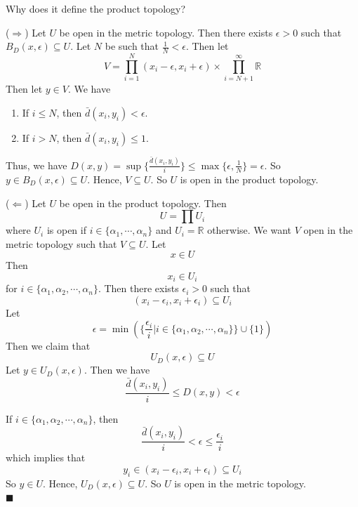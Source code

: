 \documentclass[main.tex]{subfiles}
\begin{document}
\par Why does it define the product topology?
\par ($\Rightarrow$) Let $U$ be open in the metric topology. Then there exists $\epsilon >  0$ such that $B_D(x, \epsilon) \subseteq U$. Let $N$ be such that $\frac{1}{N} < \epsilon$. Then let 
\begin{equation}
    V = \prod_{i=1}^{N} (x_i - \epsilon, x_i + \epsilon) \times \prod_{i=N+1}^{\infty} \mathbb{R}
\end{equation}
Then let $y\in V$. We have
\begin{enumerate}
    \item If $i \le N$, then $\bar{d}(x_i, y_i) < \epsilon$.
    \item If $i > N$, then $\bar{d}(x_i, y_i) \le 1$.
\end{enumerate}
Thus, we have $D(x, y) = \sup \{\frac{\bar{d}(x_i, y_i)}{i}\} \le \max\{\epsilon, \frac{1}{N}\} = \epsilon$. So $y\in B_D(x, \epsilon) \subseteq U$. Hence, $V \subseteq U$. So $U$ is open in the product topology.
\par ($\Leftarrow$) Let $U$ be open in the product topology. Then 
\begin{equation}
    U = \prod U_i
\end{equation}
where $U_i$ is open if $i\in \{\alpha_1, \cdots, \alpha_n\}$ and $U_i = \mathbb{R}$ otherwise. We want $V$ open in the metric topology such that $V \subseteq U$. Let
\begin{equation}
    x \in U
\end{equation}
Then 
\begin{equation}
    x_i \in U_i
\end{equation}
for $i\in \{\alpha_1, \alpha_2, \cdots, \alpha_n\}$. Then there exists $\epsilon_i > 0$ such that
\begin{equation}
    (x_i - \epsilon_i, x_i + \epsilon_i) \subseteq U_i
\end{equation}
Let 
\begin{equation}
    \epsilon = \min (\{\frac{\epsilon_i}{i}| i \in \{\alpha_1, \alpha_2, \cdots, \alpha_n\}\}\cup \{1\})
\end{equation}
Then we claim that
\begin{equation}
    U_D(x, \epsilon) \subseteq U
\end{equation}
Let $y\in U_D(x, \epsilon)$. Then we have
\begin{equation}
    \frac{\bar{d}(x_i, y_i)}{i} \le D(x, y) < \epsilon
\end{equation}
\par If $i \in \{\alpha_1, \alpha_2, \cdots, \alpha_n\}$, then
\begin{equation}
    \frac{\bar{d}(x_i, y_i)}{i} < \epsilon \le \frac{\epsilon_i}{i}
\end{equation}
which implies that
\begin{equation}
    y_i \in (x_i - \epsilon_i, x_i + \epsilon_i) \subseteq U_i
\end{equation}
So $y\in U$. Hence, $U_D(x, \epsilon) \subseteq U$. So $U$ is open in the metric topology.
\mbox{} \\ \null \hfill $\blacksquare$ 
\end{document}
